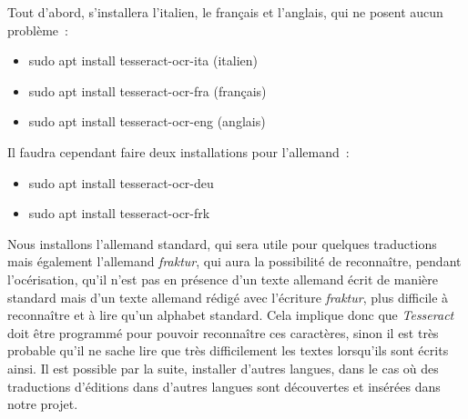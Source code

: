 Tout d'abord, s'installera l'italien, le français et l'anglais, qui ne posent aucun problème~:
\begin{itemize}
    \item sudo apt install tesseract-ocr-ita (italien)
    \item sudo apt install tesseract-ocr-fra (français)
    \item sudo apt install tesseract-ocr-eng (anglais)
\end{itemize}
Il faudra cependant faire deux installations pour l'allemand~:
\begin{itemize}
    \item sudo apt install tesseract-ocr-deu
    \item sudo apt install tesseract-ocr-frk
\end{itemize}
Nous installons l'allemand standard, qui sera utile pour quelques traductions mais également l'allemand \emph{fraktur}, qui aura la possibilité de reconnaître, pendant l'océrisation, qu'il n'est pas en présence d'un texte allemand écrit de manière standard mais d'un texte allemand rédigé avec l'écriture \emph{fraktur}, plus difficile à reconnaître et à lire qu'un alphabet standard. Cela implique donc que \emph{Tesseract} doit être programmé pour pouvoir reconnaître ces caractères, sinon il est très probable qu'il ne sache lire que très difficilement les textes lorsqu'ils sont écrits ainsi. Il est possible par la suite, installer d'autres langues, dans le cas où des traductions d'éditions dans d'autres langues sont découvertes et insérées dans notre projet.

